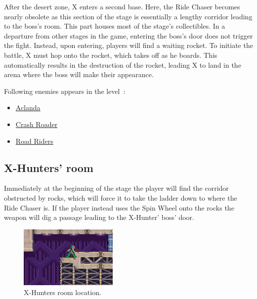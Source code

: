 After the desert zone, X enters a second base. Here, the Ride Chaser becomes nearly obsolete as this section of the stage is essentially a lengthy corridor leading to the boss's room. This part houses most of the stage's collectibles. In a departure from other stages in the game, entering the boss's door does not trigger the fight. Instead, upon entering, players will find a waiting rocket. To initiate the battle, X must hop onto the rocket, which takes off as he boards. This automatically results in the destruction of the rocket, leading X to land in the arena where the boss will make their appearance.

Following enemies appears in the level~\cite{wiki:Desert_base}:
\begin{itemize}
	\item \hyperlink{enem:Aclanda}{Aclanda}
	\item \hyperlink{enem:Crash_Roader}{Crash Roader}
	\item \hyperlink{enem:Road_Riders}{Road Riders}
\end{itemize}

\subsection{X-Hunters' room}
Immediately at the beginning of the stage the player will find the corridor obstructed by rocks, which will force it to take the ladder down to where the Ride Chaser is. If the player instead uses the Spin Wheel onto the rocks the weapon will dig a passage leading to the X-Hunter' boss' door.

\begin{figure}[htp]
	\centering
	\includegraphics[height=3cm]{figures/X2/Overdrive_ostrich/Ostrich_Hunter_room.png}
	\caption{X-Hunters room location.}
\end{figure}

